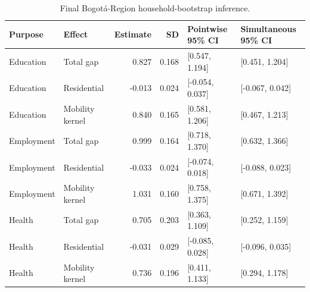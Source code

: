 \begin{table}
\caption{Final Bogotá-Region household-bootstrap inference.}
\label{tab:s4_region}
\begin{tabular}{llrrll}
\toprule
Purpose & Effect & Estimate & SD & Pointwise 95\% CI & Simultaneous 95\% CI \\
\midrule
Education & Total gap & 0.827 & 0.168 & [0.547, 1.194] & [0.451, 1.204] \\
Education & Residential & -0.013 & 0.024 & [-0.054, 0.037] & [-0.067, 0.042] \\
Education & Mobility kernel & 0.840 & 0.165 & [0.581, 1.206] & [0.467, 1.213] \\
Employment & Total gap & 0.999 & 0.164 & [0.718, 1.370] & [0.632, 1.366] \\
Employment & Residential & -0.033 & 0.024 & [-0.074, 0.018] & [-0.088, 0.023] \\
Employment & Mobility kernel & 1.031 & 0.160 & [0.758, 1.375] & [0.671, 1.392] \\
Health & Total gap & 0.705 & 0.203 & [0.363, 1.109] & [0.252, 1.159] \\
Health & Residential & -0.031 & 0.029 & [-0.085, 0.028] & [-0.096, 0.035] \\
Health & Mobility kernel & 0.736 & 0.196 & [0.411, 1.133] & [0.294, 1.178] \\
\bottomrule
\end{tabular}
\end{table}
